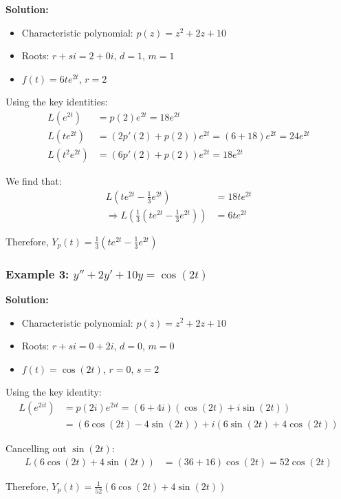 \documentclass{article}
\begin{document}
\textbf{Solution:} 
\begin{itemize}
    \item Characteristic polynomial: $p(z) = z^2+2z+10$
    \item Roots: $r+si = 2+0i$, $d = 1$, $m = 1$
    \item $f(t) = 6te^{2t}$, $r = 2$
\end{itemize}

Using the key identities:
\begin{align*}
L(e^{2t}) &= p(2)e^{2t} = 18e^{2t} \\
L(te^{2t}) &= (2p'(2)+p(2))e^{2t} = (6+18)e^{2t} = 24e^{2t} \\
L(t^2e^{2t}) &= (6p'(2)+p(2))e^{2t} = 18e^{2t}
\end{align*}

We find that:
\begin{align*}
L(te^{2t}-\frac{1}{3}e^{2t}) &= 18te^{2t} \\
\Rightarrow L(\frac{1}{3}(te^{2t}-\frac{1}{3}e^{2t})) &= 6te^{2t}
\end{align*}

Therefore, $Y_p(t) = \frac{1}{3}(te^{2t}-\frac{1}{3}e^{2t})$

\subsubsection*{Example 3: $y''+2y'+10y = \cos(2t)$}

\textbf{Solution:} 
\begin{itemize}
    \item Characteristic polynomial: $p(z) = z^2+2z+10$
    \item Roots: $r+si = 0+2i$, $d = 0$, $m = 0$
    \item $f(t) = \cos(2t)$, $r = 0$, $s = 2$
\end{itemize}

Using the key identity:
\begin{align*}
L(e^{2it}) &= p(2i)e^{2it} = (6+4i)(\cos(2t)+i\sin(2t)) \\
           &= (6\cos(2t)-4\sin(2t)) + i(6\sin(2t)+4\cos(2t))
\end{align*}

Cancelling out $\sin(2t)$:
\begin{align*}
L(6\cos(2t)+4\sin(2t)) &= (36+16)\cos(2t) = 52\cos(2t)
\end{align*}

Therefore, $Y_p(t) = \frac{1}{52}(6\cos(2t)+4\sin(2t))$
\end{document}
